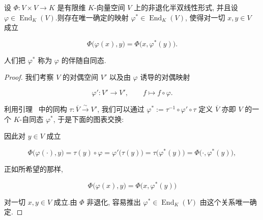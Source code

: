 \begin{theorem}\label{thm:7.4.2}
设 $\varPhi \colon V \times V \longrightarrow K$ 是有限维 $K$-向量空间 $V$ 上的非退化半双线性形式, 并且设 $\varphi \in \operatorname{End}_K(V)$.则存在唯一确定的映射 $\varphi^* \in \operatorname{End}_K(V)$, 使得对一切 $x, y \in V$ 成立

\[
\varPhi\bigl(\varphi(x), y\bigr) = \varPhi\bigl(x, \varphi^*(y)\bigr)\text{.}
\]

人们把 $\varphi^*$ 称为 $\varphi$ 的伴随自同态.
\end{theorem}

\begin{proof}
我们考察 $V$ 的对偶空间 $V'$ 以及由 $\varphi$ 诱导的对偶映射

\[
\varphi' \colon V' \longrightarrow V', \qquad f \longmapsto f \circ \varphi\text{.}
\]

利用引理~ 中的同构 $\tau \colon \overline{V} \xrightarrow{\sim} V'$, 我们可以通过 $\varphi^* := \tau^{-1} \circ \varphi' \circ \tau$ 定义 $\overline{V}$ 亦即 $V$ 的一个 $K$-自同态 $\varphi^*$, 于是下面的图表交换:

\begin{center}
\end{center}

因此对 $y \in V$ 成立

\[
\varPhi\bigl(\varphi(\cdot), y\bigr) = \tau(y) \circ \varphi = \varphi'\bigl(\tau(y)\bigr) = \tau\bigl(\varphi^*(y)\bigr) = \varPhi\bigl(\cdot, \varphi^*(y)\bigr),
\]

正如所希望的那样,

\[
\varPhi\bigl(\varphi(x), y\bigr) = \varPhi\bigl(x, \varphi^*(y)\bigr)
\]

对一切 $x, y \in V$ 成立.由 $\varPhi$ 非退化, 容易推出 $\varphi^* \in \operatorname{End}_K(V)$ 由这个关系唯一确定.
\end{proof}

